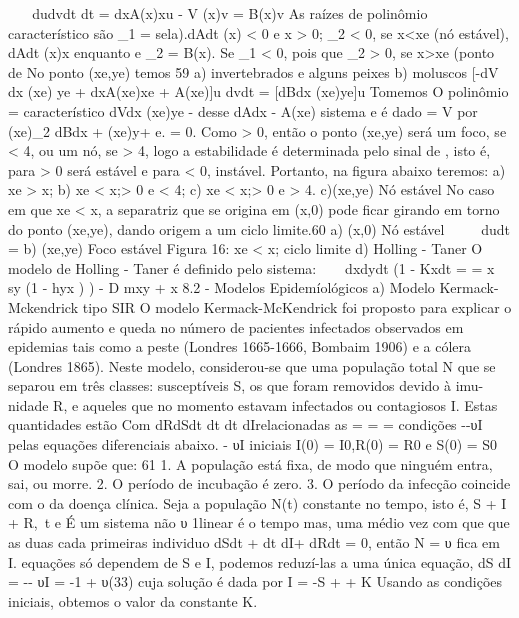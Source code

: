 {{{{{{{{{{{{{{{{{{{{{ 
dudvdt dt = dxA(x)xu - V (x)v 
= B(x)v 
As raízes de polinômio característico são \lambda_{1} = sela).dAdt (x) < 0 e x > 0; \lambda_{2} < 0, se x<xe (nó estável), dAdt (x)x enquanto e \lambda_{2} = B(x). Se \lambda_{1} < 0, pois que \lambda_{2} > 0, se x>xe (ponto de 
No ponto (xe,ye) temos 
59 
a) invertebrados e alguns peixes 
b) moluscos 
[-dV dx (xe) 
ye + dxA(xe)xe + A(xe)]u dvdt = 
[dBdx (xe)ye]u Tomemos O polinômio \alpha  = característico dVdx (xe)ye - desse dAdx - A(xe) sistema e é dado \beta = V por (xe)\lambda_{2} dBdx + (x\alpha \lambda e)y+ e. 
\beta = 0. Como \beta > 0, então o ponto (xe,ye) será um foco, se  < 4\beta, ou um nó, se  > 4\beta, logo a estabilidade é determinada pelo sinal de \alpha , isto é, para \alpha  > 0 será estável e para \alpha  < 0, instável. 
Portanto, na figura abaixo teremos: 
a) xe > x; 
b) xe < x;\alpha  > 0 e  < 4\beta; 
c) xe < x;\alpha  > 0 e  > 4\beta. 
c)(xe,ye) Nó estável 
No caso em que xe < x, a separatriz que se origina em (x,0) pode ficar girando em torno do ponto (xe,ye), dando origem a um ciclo limite.60 
a) (x,0) Nó estável 
 
dudt = 
b) (xe,ye) Foco estável 
Figura 16: xe < x; ciclo limite 
d) Holling - Taner 
O modelo de Holling - Taner é definido pelo sistema:  
dxdydt (1 - Kxdt = = \gamma x sy 
(1 - hyx 
) 
) 
- D mxy + x 8.2 - Modelos Epidemíológicos 
a) Modelo Kermack-Mckendrick tipo SIR 
O modelo Kermack-McKendrick foi proposto para explicar o rápido aumento e queda no número de pacientes infectados observados em epidemias tais como a peste (Londres 1665-1666, Bombaim 1906) e a cólera (Londres 1865). Neste modelo, considerou-se que uma população total N que se separou em três classes: susceptíveis S, os que foram removidos devido à imu- nidade R, e aqueles que no momento estavam infectados ou contagiosos I. Estas quantidades estão Com dRdSdt dt dt dIrelacionadas as = = = condições -\betaSI -\betaSI υI 
pelas equações diferenciais abaixo. - υI 
iniciais I(0) = I0,R(0) = R0 e S(0) = S0 O modelo supõe que: 
61 
1. A população está fixa, de modo que ninguém entra, sai, ou morre. 
2. O período de incubação é zero. 
3. O período da infecção coincide com o da doença clínica. 
Seja a população N(t) constante no tempo, isto é, S + I + R,\forall\ t  e É um sistema não υ 1linear é o tempo mas, uma médio vez com que que as duas cada primeiras individuo dSdt + dt dI+ dRdt = 0, então N = 
υ fica em I. equações só dependem de S e I, podemos reduzí-las a uma única equação, 
dS dI 
= \betaSI -\betaSI - υI 
= -1 + \betaS υ(33) cuja solução é dada por 
I = -S +  + K Usando as condições iniciais, obtemos o valor da constante K. 
}}}}}}}}}}}}}}}}}}}}}
